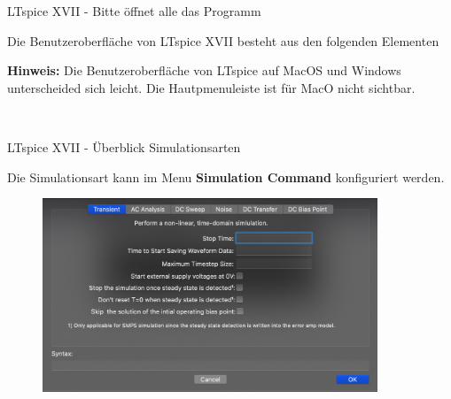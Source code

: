\documentclass{beamer}
\begin{document}
\begin{frame}[fragile]{LTspice XVII - Bitte öffnet alle das Programm}
	
Die Benutzeroberfläche von LTspice XVII besteht aus den folgenden Elementen
\begin{spacing}{0.6} \begin{tiny} \textbf{Hinweis:} Die Benutzeroberfläche von LTspice auf MacOS und Windows unterscheided sich leicht. 
  Die Hautpmenuleiste ist für MacO nicht sichtbar.
  \end{tiny} \end{spacing}

\begin{figure}
  \centering
  \\
  \qquad    
\end{figure}

  \end{frame}

  \begin{frame}{LTspice XVII - Überblick Simulationsarten}

    Die Simulationsart kann im Menu \textbf{Simulation Command} konfiguriert werden. 

    \begin{figure}
      \centering
      \includegraphics[width=10cm]{pictures/simulationcmd.png}
    \end{figure}
    
  \end{frame}
\end{document}

